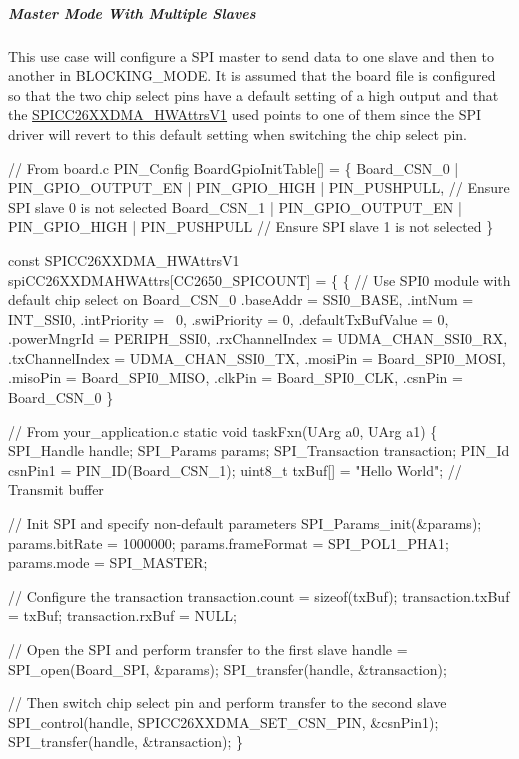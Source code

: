 \subparagraph*{Master Mode With Multiple Slaves\label{_s_p_i_c_c26_x_x_d_m_a_8h_USE_CASE_MMMS}%
\hypertarget{_s_p_i_c_c26_x_x_d_m_a_8h_USE_CASE_MMMS}{}%
}

This use case will configure a S\+P\+I master to send data to one slave and then to another in B\+L\+O\+C\+K\+I\+N\+G\+\_\+\+M\+O\+D\+E. It is assumed that the board file is configured so that the two chip select pins have a default setting of a high output and that the \hyperlink{struct_s_p_i_c_c26_x_x_d_m_a___h_w_attrs_v1}{S\+P\+I\+C\+C26\+X\+X\+D\+M\+A\+\_\+\+H\+W\+Attrs\+V1} used points to one of them since the S\+P\+I driver will revert to this default setting when switching the chip select pin.


\begin{DoxyCode}
\textcolor{comment}{// From board.c}
PIN_Config BoardGpioInitTable[] = \{
    Board\_CSN\_0   | PIN_GPIO_OUTPUT_EN | PIN_GPIO_HIGH   | PIN_PUSHPULL,   \textcolor{comment}{// Ensure SPI slave 0 is not
       selected}
    Board\_CSN\_1   | PIN_GPIO_OUTPUT_EN | PIN_GPIO_HIGH   | PIN_PUSHPULL    \textcolor{comment}{// Ensure SPI slave 1 is not
       selected}
\}

\textcolor{keyword}{const} SPICC26XXDMA_HWAttrsV1 spiCC26XXDMAHWAttrs[CC2650\_SPICOUNT] = \{
\{   \textcolor{comment}{// Use SPI0 module with default chip select on Board\_CSN\_0}
    .baseAddr = SSI0\_BASE,
    .intNum = INT\_SSI0,
    .intPriority = ~0,
    .swiPriority = 0,
    .defaultTxBufValue = 0,
    .powerMngrId = PERIPH\_SSI0,
    .rxChannelIndex = UDMA\_CHAN\_SSI0\_RX,
    .txChannelIndex = UDMA\_CHAN\_SSI0\_TX,
    .mosiPin = Board\_SPI0\_MOSI,
    .misoPin = Board\_SPI0\_MISO,
    .clkPin = Board\_SPI0\_CLK,
    .csnPin = Board\_CSN\_0
\}

\textcolor{comment}{// From your\_application.c}
\textcolor{keyword}{static} \textcolor{keywordtype}{void} taskFxn(UArg a0, UArg a1)
\{
    SPI_Handle handle;
    SPI_Params params;
    SPI_Transaction transaction;
    PIN_Id csnPin1  = PIN_ID(Board\_CSN\_1);
    uint8\_t txBuf[] = \textcolor{stringliteral}{"Hello World"};    \textcolor{comment}{// Transmit buffer}

    \textcolor{comment}{// Init SPI and specify non-default parameters}
    SPI_Params_init(&params);
    params.bitRate     = 1000000;
    params.frameFormat = SPI_POL1_PHA1;
    params.mode        = SPI_MASTER;

    \textcolor{comment}{// Configure the transaction}
    transaction.count = \textcolor{keyword}{sizeof}(txBuf);
    transaction.txBuf = txBuf;
    transaction.rxBuf = NULL;

    \textcolor{comment}{// Open the SPI and perform transfer to the first slave}
    handle = SPI_open(Board\_SPI, &params);
    SPI_transfer(handle, &transaction);

    \textcolor{comment}{// Then switch chip select pin and perform transfer to the second slave}
    SPI_control(handle, SPICC26XXDMA_SET_CSN_PIN, &csnPin1);
    SPI_transfer(handle, &transaction);
\}
\end{DoxyCode}


